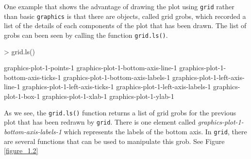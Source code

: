 \documentclass[paper=a4, fontsize=11pt]{report}
\begin{document}
One example that shows the advantage of drawing the plot using \texttt{grid} rather than basic \texttt{graphics} is that there are objects, called grid grobs, which recorded a list of the details of each components of the plot that has been drawn. The list of grobs can been seen by calling the function \texttt{grid.ls()}. \\
\begin{Schunk}
\begin{Sinput}
> grid.ls()
\end{Sinput}
\begin{Soutput}
graphics-plot-1-points-1
graphics-plot-1-bottom-axis-line-1
graphics-plot-1-bottom-axis-ticks-1
graphics-plot-1-bottom-axis-labels-1
graphics-plot-1-left-axis-line-1
graphics-plot-1-left-axis-ticks-1
graphics-plot-1-left-axis-labels-1
graphics-plot-1-box-1
graphics-plot-1-xlab-1
graphics-plot-1-ylab-1
\end{Soutput}
\end{Schunk}


As we see, the \texttt{grid.ls()} function returns a list of grid grobs for the previous plot that has been redrawn by \texttt{grid}. There is one element called \textit{graphics-plot-1-bottom-axis-labels-1} which represents the labels of the bottom axis. In \texttt{grid}, there are several functions that can be used to manipulate this grob. See Figure \ref{figure_1.2} \\
\end{document}
